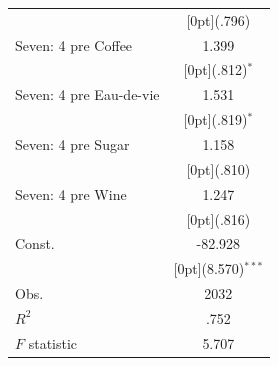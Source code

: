 \documentclass[12pt,a4paper,titlepage]{article}
\begin{document}
{\begin{tabular*}{\textwidth}{@{\extracolsep{\fill}}lc}
&	\raisebox{.7ex}[0pt]{\scriptsize (.796)} \\
Seven: 4 pre Coffee &	1.399 \\
&	\raisebox{.7ex}[0pt]{\scriptsize (.812)$^{*}$} \\
Seven: 4 pre Eau-de-vie &	1.531 \\
&	\raisebox{.7ex}[0pt]{\scriptsize (.819)$^{*}$} \\
Seven: 4 pre Sugar &	1.158 \\
&	\raisebox{.7ex}[0pt]{\scriptsize (.810)} \\
Seven: 4 pre Wine &	1.247 \\
&	\raisebox{.7ex}[0pt]{\scriptsize (.816)} \\
Const. &	-82.928 \\
&	\raisebox{.7ex}[0pt]{\scriptsize (8.570)$^{***}$} \\
Obs. &	2032 \\
$ R^2$ &	.752 \\
$ F$ statistic &	5.707 \\
\hline\hline	
\end{tabular*}%

}
\end{document}
